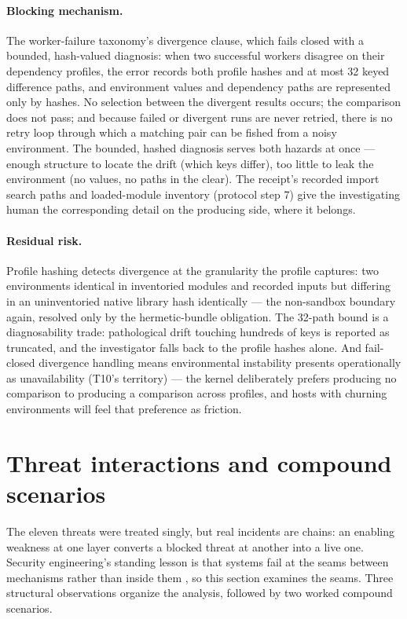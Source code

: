 \paragraph{Blocking mechanism.} The worker-failure taxonomy's divergence clause, which fails closed with a bounded, hash-valued diagnosis: when two successful workers disagree on their dependency profiles, the error records both profile hashes and at most 32 keyed difference paths, and environment values and dependency paths are represented only by hashes. No selection between the divergent results occurs; the comparison does not pass; and because failed or divergent runs are never retried, there is no retry loop through which a matching pair can be fished from a noisy environment. The bounded, hashed diagnosis serves both hazards at once --- enough structure to locate the drift (which keys differ), too little to leak the environment (no values, no paths in the clear). The receipt's recorded import search paths and loaded-module inventory (protocol step 7) give the investigating human the corresponding detail on the producing side, where it belongs.

\paragraph{Residual risk.} Profile hashing detects divergence at the granularity the profile captures: two environments identical in inventoried modules and recorded inputs but differing in an uninventoried native library hash identically --- the non-sandbox boundary again, resolved only by the hermetic-bundle obligation. The 32-path bound is a diagnosability trade: pathological drift touching hundreds of keys is reported as truncated, and the investigator falls back to the profile hashes alone. And fail-closed divergence handling means environmental instability presents operationally as unavailability (T10's territory) --- the kernel deliberately prefers producing no comparison to producing a comparison across profiles, and hosts with churning environments will feel that preference as friction.

\section{Threat interactions and compound scenarios}\label{threat:compound}

The eleven threats were treated singly, but real incidents are chains: an enabling weakness at one layer converts a blocked threat at another into a live one. Security engineering's standing lesson is that systems fail at the seams between mechanisms rather than inside them \cite{anderson}, so this section examines the seams. Three structural observations organize the analysis, followed by two worked compound scenarios.

